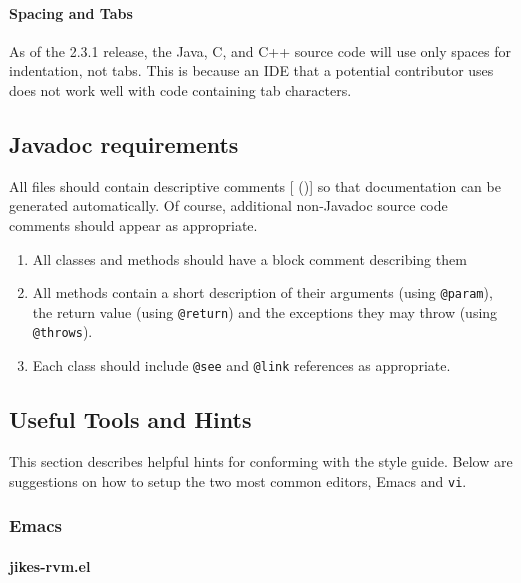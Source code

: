 \paragraph{Spacing and Tabs}

As of the \jrvm{} 2.3.1 release, the Java, C, and C++ source code will
use only spaces for indentation, not tabs.  This is because an IDE
that a potential contributor uses does not work well with code
containing tab characters.  

\subsection {Javadoc requirements}

All files should contain descriptive comments
[ (\texttt{\JavadocURL})]{\JavadocURL}
so
that documentation can be generated automatically.  Of course,
additional non-Javadoc source code comments should appear as
appropriate.

\begin{enumerate}
\item All classes and methods should have a block comment describing
them
\item All methods contain a short description of their arguments
(using {\tt @param}), the return value (using {\tt @return}) and the
exceptions they may throw (using {\tt @throws}).
\item Each class should include {\tt @see} and {\tt @link} 
references as appropriate.
\end{enumerate}

\subsection{Useful Tools and Hints}

This section describes helpful hints for conforming with the style
guide.  Below are suggestions on how to setup the two most common
editors, Emacs and \texttt{vi}. 

\subsubsection{Emacs}



\paragraph{jikes-rvm.el}

